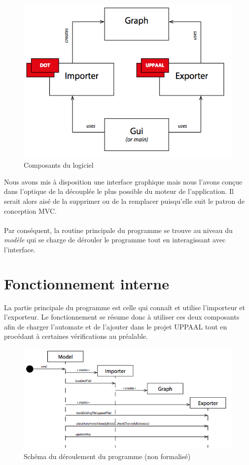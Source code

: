 \documentclass[12pt,a4paper]{report}
\begin{document}
\begin{figure}[!h]
  \centering
  \includegraphics[scale=0.6]{ressources/archi.png}
  \caption{Composants du logiciel}
\end{figure}

Nous avons mis à disposition une interface graphique mais nous l'avons conçue dans l'optique 
de la découplée le plus possible du moteur de l'application. Il serait alors aisé de la supprimer
ou de la remplacer puisqu'elle suit le patron de conception MVC. 
\\\\
Par conséquent, la routine principale du programme se trouve au niveau du 
\emph{modèle} qui se charge de dérouler le programme tout en interagissant 
avec l'interface.

\section{Fonctionnement interne}

La partie principale du programme est celle qui connaît et utilise l'importeur 
et l'exporteur. Le fonctionnement se résume donc à utiliser ces deux composants
afin de charger l'automate et de l'ajouter dans le projet UPPAAL tout en procédant
à certaines vérifications au préalable.

\begin{figure}[!h]
  \centering
  \includegraphics[scale=0.6]{ressources/deroulement.png}
  \caption{Schéma du déroulement du programme (non formalisé)}
\end{figure}
\end{document}
